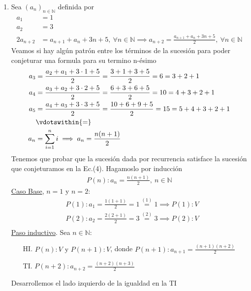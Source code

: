 \begin{enumerate}[label=\roman*)]
    \item Sea $(a_n)_{n \in \mathbb{N}}$ definida por
    \setcounter{equation}{0}
    \begin{align}
        a_1 &= 1 \\
        a_2 &= 3 \\
        2a_{n+2} &= a_{n+1} + a_n + 3n + 5,\ \forall n \in \mathbb{N} \implies 
        a_{n+2} = \frac{a_{n+1} + a_n + 3n + 5}{2},\ \forall n \in \mathbb{N}
    \end{align}
    Veamos si hay algún patrón entre los términos de la sucesión para poder conjeturar una formula para su termino 
    n-ésimo
    \begin{align}
        a_3 &= \frac{a_{2} + a_1 + 3 \cdot 1 + 5}{2} = \frac{3 + 1 + 3 + 5}{2}  = 6 = 3 + 2 + 1 \nonumber \\
        a_4 &= \frac{a_{3} + a_2 + 3 \cdot 2 + 5}{2} = \frac{6 + 3 + 6 + 5}{2}  = 10 = 4 + 3 + 2 + 1 \nonumber \\
        a_5 &= \frac{a_{4} + a_3 + 3 \cdot 3 + 5}{2} = \frac{10 + 6 + 9 + 5}{2}  = 15 = 5 + 4 + 3 + 2 + 1 \nonumber \\
        &\vdotswithin{=} \nonumber \\
        a_n &= \sum_{i=1}^{n} i \implies a_n = \frac{n(n+1)}{2}
    \end{align}
    Tenemos que probar que la sucesión dada por recurrencia satisface la sucesión que conjeturamos en la Ec.(4). 
    Hagamoslo por inducción
    \begin{align*}
        P(n): a_n = \frac{n(n+1)}{2}, \ n \in \mathbb{N}   
    \end{align*}
    \underline{Caso Base}, $n = 1$ y $n = 2$:
	\begin{align*}
		&P(1): a_1 = \frac{1(1+1)}{2} = 1 \overset{(1)}{=} 1 \implies P(1):V \\
        &P(2): a_2 = \frac{2(2+1)}{2} = 3 \overset{(2)}{=} 3 \implies P(2):V \\
	\end{align*}
	\underline{Paso inductivo}. Sea $n \in \mathbb{N}$:
	\begin{enumerate}
        \item[HI.] $P(n):V \text{ y } P(n+1):V$, donde $P(n+1): a_{n+1} = \displaystyle \frac{(n+1)(n+2)}{2}$
        \item[TI.] $P(n+2): a_{n+2} = \displaystyle \frac{(n+2)(n+3)}{2}$
    \end{enumerate}
 	Desarrollemos el lado izquierdo de la igualdad en la TI
    \begin{align*}

\end{align*}
\end{enumerate}
